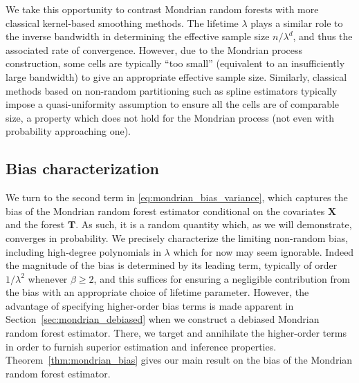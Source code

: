 \documentclass[11pt,lof]{puthesis}
\newcommand{\bX}{\ensuremath{\mathbf{X}}}
\newcommand{\bT}{\ensuremath{\mathbf{T}}}
\theoremstyle{break}
\theoremstyle{proof}
\begin{document}
We take this opportunity to contrast Mondrian random forests with more
classical kernel-based smoothing methods. The lifetime $\lambda$ plays a
similar role to the inverse bandwidth in determining the effective sample size
$n / \lambda^d$, and thus the associated rate of convergence. However, due to
the Mondrian process construction, some cells are typically ``too small''
(equivalent to an insufficiently large bandwidth) to give an appropriate
effective sample size. Similarly, classical methods based on non-random
partitioning such as spline estimators \citep{huang2003local,cattaneo2020large}
typically impose a quasi-uniformity assumption to ensure all the cells are of
comparable size, a property which does not hold for the Mondrian process (not
even with probability approaching one).

\subsection*{Bias characterization}

We turn to the second term in \eqref{eq:mondrian_bias_variance}, which captures
the bias
of the Mondrian random forest estimator conditional on the covariates $\bX$ and
the forest $\bT$. As such, it is a random quantity which, as we will
demonstrate, converges in probability. We precisely characterize the limiting
non-random bias, including high-degree polynomials in $\lambda$ which for now
may seem ignorable. Indeed the magnitude of the bias is determined by its
leading term, typically of order $1/\lambda^2$ whenever $\beta \geq 2$, and
this suffices for ensuring a negligible contribution from the bias with an
appropriate choice of lifetime parameter. However, the advantage of specifying
higher-order bias terms is made apparent in Section~\ref{sec:mondrian_debiased}
when we
construct a debiased Mondrian random forest estimator. There, we target and
annihilate the higher-order terms in order to furnish superior estimation and
inference properties.
Theorem~\ref{thm:mondrian_bias} gives our main result on
the bias of the Mondrian random forest estimator.
\end{document}
